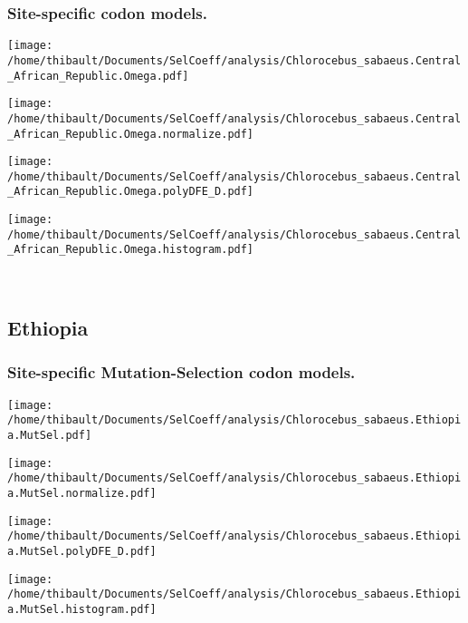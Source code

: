 \subsubsection*{Site-specific codon models.} 
\begin{minipage}{0.49\linewidth} 
\texttt{[image: /home/thibault/Documents/SelCoeff/analysis/Chlorocebus\_sabaeus.Central\_African\_Republic.Omega.pdf]} 
\end{minipage}
\begin{minipage}{0.49\linewidth} 
\texttt{[image: /home/thibault/Documents/SelCoeff/analysis/Chlorocebus\_sabaeus.Central\_African\_Republic.Omega.normalize.pdf]} 
\end{minipage}
\begin{minipage}{0.49\linewidth} 
\texttt{[image: /home/thibault/Documents/SelCoeff/analysis/Chlorocebus\_sabaeus.Central\_African\_Republic.Omega.polyDFE\_D.pdf]} 
\end{minipage}
\begin{minipage}{0.49\linewidth} 
\texttt{[image: /home/thibault/Documents/SelCoeff/analysis/Chlorocebus\_sabaeus.Central\_African\_Republic.Omega.histogram.pdf]} 
\end{minipage}
\\ 
\subsection{Ethiopia} 
 
\subsubsection*{Site-specific Mutation-Selection codon models.} 
\begin{minipage}{0.49\linewidth} 
\texttt{[image: /home/thibault/Documents/SelCoeff/analysis/Chlorocebus\_sabaeus.Ethiopia.MutSel.pdf]} 
\end{minipage}
\begin{minipage}{0.49\linewidth} 
\texttt{[image: /home/thibault/Documents/SelCoeff/analysis/Chlorocebus\_sabaeus.Ethiopia.MutSel.normalize.pdf]} 
\end{minipage}
\begin{minipage}{0.49\linewidth} 
\texttt{[image: /home/thibault/Documents/SelCoeff/analysis/Chlorocebus\_sabaeus.Ethiopia.MutSel.polyDFE\_D.pdf]} 
\end{minipage}
\begin{minipage}{0.49\linewidth} 
\texttt{[image: /home/thibault/Documents/SelCoeff/analysis/Chlorocebus\_sabaeus.Ethiopia.MutSel.histogram.pdf]} 
\end{minipage}
\\ 
